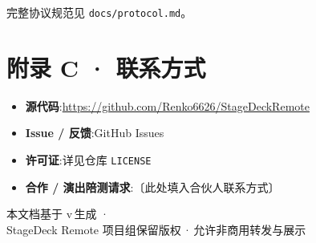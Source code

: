 完整协议规范见 \texttt{docs/protocol.md}。

\vspace{0.6em}

\section*{附录 C · 联系方式}

\begin{itemize}
  \item \textbf{源代码}:\url{https://github.com/Renko6626/StageDeckRemote}
  \item \textbf{Issue / 反馈}:GitHub Issues
  \item \textbf{许可证}:详见仓库 \texttt{LICENSE}
  \item \textbf{合作 / 演出陪测请求}:〔此处填入合伙人联系方式〕
\end{itemize}

\vspace{1cm}

\begin{center}
\small\sffamily\color{sddim}
本文档基于\,\app\,v\sdVersion\,生成 \quad·\quad \sdDate\\[2pt]
StageDeck Remote 项目组保留版权\,·\,允许非商用转发与展示
\end{center}
